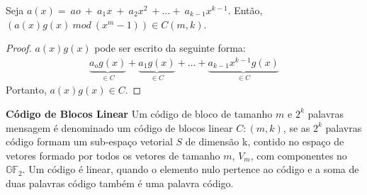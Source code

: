 \begin{proposition} Seja $a(x)= \ ao\ +\ a_1x\ +\ a_2x^2\ + \ldots +\ a_{k-1}x^{k-1}$. Então, $(a(x)g(x)\ mod\ (x^m -1)) \in C(m,k)$.
\end{proposition}

\begin{proof} $a(x)g(x)$ pode ser escrito da seguinte forma: 
\begin{align*}
\underbrace{a_og(x)}_{\in C} + \underbrace{a_1g(x)}_{\in C} + \ldots + \underbrace{a_{k-1}x^{k-1}g(x)}_{\in C}
\end{align*}
Portanto,  $a(x)g(x) \in C$.  
\end{proof}

\begin{definition} {\bf Código de Blocos Linear} \label{CodBlocLin}  Um código de bloco de tamanho $m$ e $2^k$ palavras mensagem é denominado um código de blocos linear $C:(m,k)$, se as $2^k$ palavras código formam um sub-espaço vetorial $S$ de dimensão k, contido no espaço de vetores formado por todos os vetores de tamanho $m$, $V_m$, com componentes no $\mathbb{GF}_2$. Um código é linear, quando o elemento  nulo pertence ao código e a soma de duas palavras código também é uma palavra código.
\end{definition}

